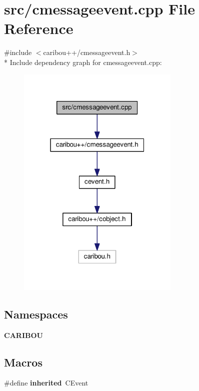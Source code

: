 \section{src/cmessageevent.cpp File Reference}
\label{cmessageevent_8cpp}
{\ttfamily \#include $<$caribou++/cmessageevent.\+h$>$}\\*
Include dependency graph for cmessageevent.\+cpp\+:
\nopagebreak
\begin{figure}[H]
\begin{center}
\leavevmode
\includegraphics[width=220pt]{cmessageevent_8cpp__incl}
\end{center}
\end{figure}
\subsection*{Namespaces}
\begin{DoxyCompactItemize}
\item 
 {\bf C\+A\+R\+I\+B\+OU}
\end{DoxyCompactItemize}
\subsection*{Macros}
\begin{DoxyCompactItemize}
\item 
\#define {\bf inherited}~C\+Event
\end{DoxyCompactItemize}


